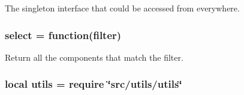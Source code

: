 The singleton interface that could be accessed from everywhere. 

\hypertarget{world_8lua_ae180890d7caabe9962d544350eca4638}{
\subsubsection[{select}]{\setlength{\rightskip}{0pt plus 5cm}select = function(filter)}}\label{world_8lua_ae180890d7caabe9962d544350eca4638}


Return all the components that match the filter. 

\hypertarget{world_8lua_a9b2ba82def3d3656dc370bac0a641700}{
\subsubsection[{utils}]{\setlength{\rightskip}{0pt plus 5cm}local utils = require \char`\"{}src/utils/utils\char`\"{}}}\label{world_8lua_a9b2ba82def3d3656dc370bac0a641700}
